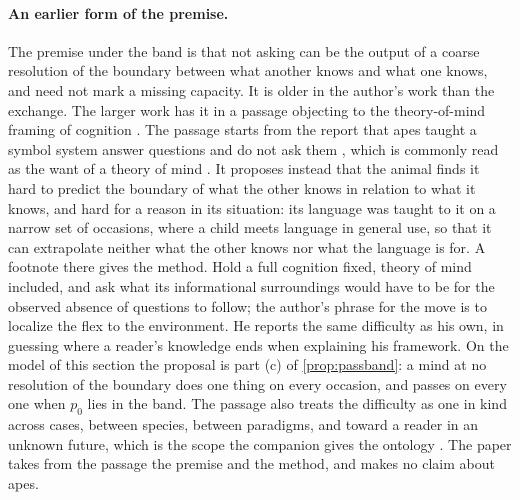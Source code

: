 \paragraph{An earlier form of the premise.} The premise under the band is that not asking can be the output of a coarse resolution of the boundary between what another knows and what one knows, and need not mark a missing capacity. It is older in the author's work than the exchange. The larger work has it in a passage objecting to the theory-of-mind framing of cognition \cite{Aethus}. The passage starts from the report that apes taught a symbol system answer questions and do not ask them \cite{PremackPremack1983}, which is commonly read as the want of a theory of mind \cite{PremackWoodruff1978}. It proposes instead that the animal finds it hard to predict the boundary of what the other knows in relation to what it knows, and hard for a reason in its situation: its language was taught to it on a narrow set of occasions, where a child meets language in general use, so that it can extrapolate neither what the other knows nor what the language is for. A footnote there gives the method. Hold a full cognition fixed, theory of mind included, and ask what its informational surroundings would have to be for the observed absence of questions to follow; the author's phrase for the move is to localize the flex to the environment. He reports the same difficulty as his own, in guessing where a reader's knowledge ends when explaining his framework. On the model of this section the proposal is part (c) of \autoref{prop:passband}: a mind at no resolution of the boundary does one thing on every occasion, and passes on every one when $p_0$ lies in the band. The passage also treats the difficulty as one in kind across cases, between species, between paradigms, and toward a reader in an unknown future, which is the scope the companion gives the ontology \cite{NormCost}. The paper takes from the passage the premise and the method, and makes no claim about apes.

